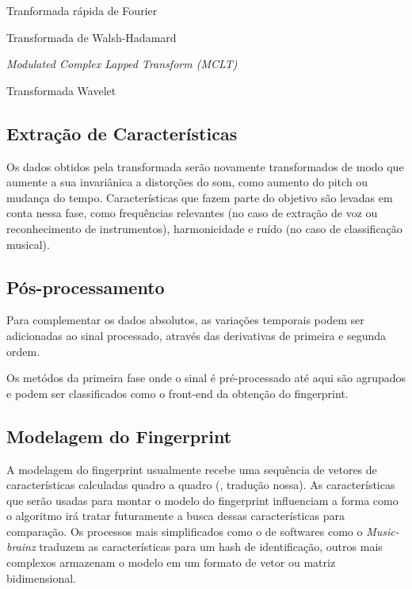 \begin{alineas}

\item Tranformada rápida de Fourier
\item Transformada de Walsh-Hadamard
\item \emph{Modulated Complex Lapped Transform (MCLT)}
\item Transformada Wavelet

\end{alineas}


\subsection{Extração de Características}
\label{ss.extracaocaracteristicas}

Os dados obtidos pela transformada serão novamente transformados de modo que aumente a sua invariânica a distorções do som, como aumento do pitch ou mudança do tempo. Características que fazem parte do objetivo são levadas em conta nessa fase, como frequências relevantes (no caso de extração de voz ou reconhecimento de instrumentos), harmonicidade e ruído (no caso de classificação musical).

\subsection{Pós-processamento}
\label{ss.posprocessamento}

Para complementar os dados absolutos, as variações temporais podem ser adicionadas ao sinal processado, através das derivativas de primeira e segunda ordem.

Os metódos da primeira fase onde o sinal é pré-processado até aqui são agrupados e podem ser classificados como o front-end da obtenção do fingerprint.

\subsection{Modelagem do Fingerprint}
\label{ss.modelagemfingerprint}

A modelagem do fingerprint usualmente recebe uma sequência de vetores de características calculadas quadro a quadro  (\citeyear{canoetal05}, tradução nossa). As características que serão usadas para montar o modelo do fingerprint influenciam a forma como o algoritmo irá tratar futuramente a busca dessas características para comparação. Os processos mais simplificados como o de softwares como o \emph{Music-brainz} traduzem as características para um hash de identificação, outros mais complexos armazenam o modelo em um formato de vetor ou matriz bidimensional.

